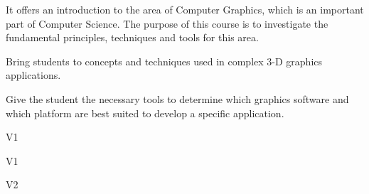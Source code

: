 \begin{syllabus}


\begin{justification}
It offers an introduction to the area of Computer Graphics, which is an important part of Computer Science.
The purpose of this course is to investigate the fundamental principles, techniques and tools for this area.
\end{justification}

\begin{goals}
\item Bring students to concepts and techniques used in complex 3-D graphics applications.
\item Give the student the necessary tools to determine which graphics software and which platform are best suited to develop a specific application.
\end{goals}

\begin{outcomes}{V1}
    \item {}
    \item {}
    \item {}
    \item {}
\end{outcomes}

\begin{specificoutcomes}{V1}
    \item {}
    \item {}
    \item {}
    \item {}
    \item {}
    \item {}
    \item {}
    \item {}
    \item {}
\end{specificoutcomes}

\begin{outcomes}{V2}
    \item {}
    \item {}
    \item {}
\end{outcomes}


\end{syllabus}
